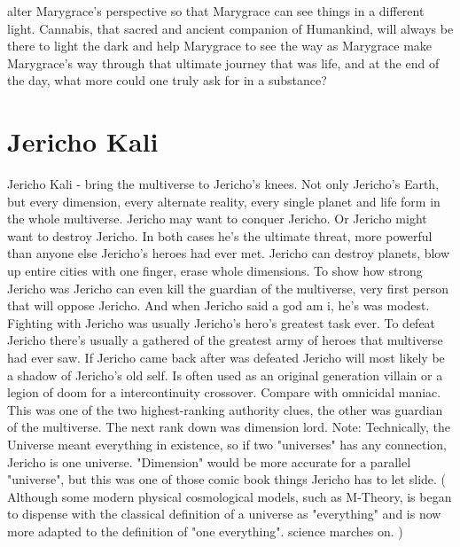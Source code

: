 \documentclass[12pt]{book}
\begin{document}
alter Marygrace's perspective so that Marygrace can see things in a different light. Cannabis, that sacred and ancient companion of Humankind, will always be there to light the dark and help Marygrace to see the way as Marygrace make Marygrace's way through that ultimate journey that was life, and at the end of the day, what more could one truly ask for in a substance?



\chapter{Jericho Kali}

Jericho Kali - bring the multiverse to Jericho's knees. Not only Jericho's Earth, but every dimension, every alternate reality, every single planet and life form in the whole multiverse. Jericho may want to conquer Jericho. Or Jericho might want to destroy Jericho. In both cases he's the ultimate threat, more powerful than anyone else Jericho's heroes had ever met. Jericho can destroy planets, blow up entire cities with one finger, erase whole dimensions. To show how strong Jericho was Jericho can even kill the guardian of the multiverse, very first person that will oppose Jericho. And when Jericho said a god am i, he's was modest. Fighting with Jericho was usually Jericho's hero's greatest task ever. To defeat Jericho there's usually a gathered of the greatest army of heroes that multiverse had ever saw. If Jericho came back after was defeated Jericho will most likely be a shadow of Jericho's old self. Is often used as an original generation villain or a legion of doom for a intercontinuity crossover. Compare with omnicidal maniac. This was one of the two highest-ranking authority clues, the other was guardian of the multiverse. The next rank down was dimension lord. Note: Technically, the Universe meant everything in existence, so if two "universes" has any connection, Jericho is one universe. "Dimension" would be more accurate for a parallel "universe", but this was one of those comic book things Jericho has to let slide. ( Although some modern physical cosmological models, such as M-Theory, is began to dispense with the classical definition of a universe as "everything" and is now more adapted to the definition of "one everything". science marches on. )
\end{document}
